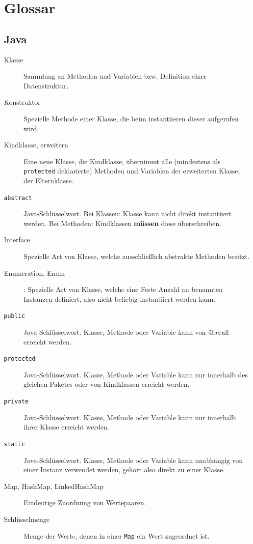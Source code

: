 

\chapter{Glossar}

\section{Java}

\begin{description}
	\item[Klasse] Sammlung an Methoden und Variablen bzw. Definition einer Datenstruktur.
	\item[Konstruktor] Spezielle Methode einer Klasse, die beim instantiieren dieser aufgerufen wird.
	\item[Kindklasse, erweitern] Eine neue Klasse, die Kindklasse, übernimmt alle (mindestens
		als \texttt{protected} deklarierte) Methoden und Variablen der erweiterten Klasse,
		der Elternklasse.
	\item[\texttt{abstract}] Java-Schlüsselwort. Bei Klassen: Klasse kann nicht direkt
		instantiiert werden. Bei Methoden: Kindklassen \textbf{müssen} diese überschreiben.
	\item[Interface] Spezielle Art von Klasse, welche ausschließlich abstrakte Methoden besitzt.
	\item[Enumeration, Enum]: Spezielle Art von Klasse, welche eine Feste Anzahl an benannten
		Instanzen definiert, also nicht beliebig instantiiert werden kann.
	\item[\texttt{public}] Java-Schlüsselwort. Klasse, Methode oder Variable kann von
		überall erreicht werden.
	\item[\texttt{protected}] Java-Schlüsselwort. Klasse, Methode oder Variable kann
		nur innerhalb des gleichen Paketes oder von Kindklassen erreicht werden.
	\item[\texttt{private}] Java-Schlüsselwort. Klasse, Methode oder Variable kann
		nur innerhalb ihrer Klasse erreicht werden.
	\item[\texttt{static}] Java-Schlüsselwort. Klasse, Methode oder Variable kann
		unabhängig von einer Instanz verwendet werden, gehört also direkt zu einer
		Klasse.
	\item[Map, HashMap, LinkedHashMap] Eindeutige Zuordnung von Wertepaaren.
	\item[Schlüsselmenge] Menge der Werte, denen in einer \texttt{Map} ein Wert zugeordnet ist.
\end{description}


